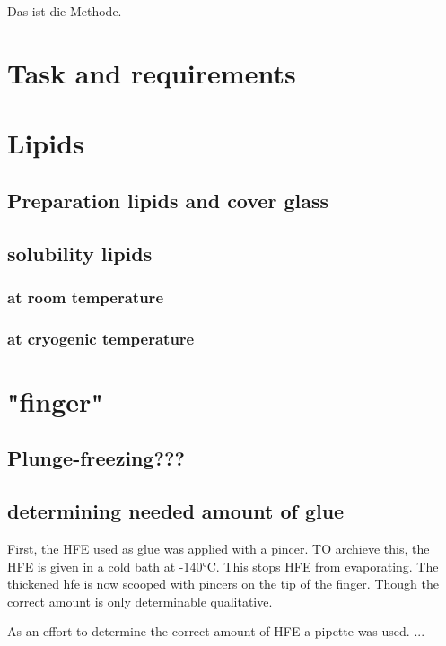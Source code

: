 Das ist die Methode.

\section{Task and requirements}

\section{Lipids}

\subsection{Preparation lipids and cover glass}

\subsection{solubility lipids}

\subsubsection{at room temperature}

\subsubsection{at cryogenic temperature}

\section{"finger"}

\subsection{Plunge-freezing???}

\subsection{determining needed amount of glue}

First, the HFE used as glue was applied with a pincer. TO archieve this, the HFE is given in a cold bath at -140°C. This stops HFE from evaporating. The thickened hfe is now scooped with pincers on the tip of the finger. Though the correct amount is only determinable qualitative.

As an effort to determine the correct amount of HFE a pipette was used. ...


